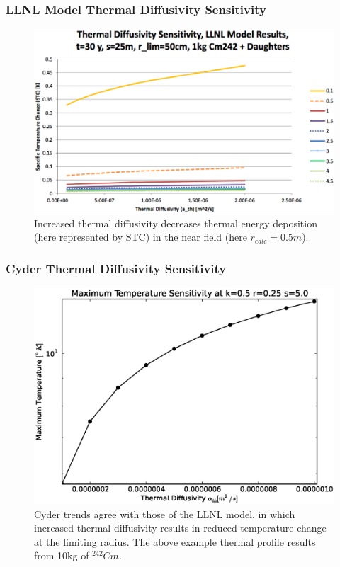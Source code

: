 
\begin{frame}[ctb!]
\frametitle{LLNL Model Thermal Diffusivity Sensitivity}
\begin{figure}[htbp!]
\begin{center}
\includegraphics[height=0.7\textheight]{./thermal_demonstration/diffusivity/diffusivity.eps}
\end{center}
\caption[$K_{th}$ Sensitivity to $\alpha_{th}$]{Increased thermal 
diffusivity decreases thermal energy deposition (here represented by STC) in 
the near field (here $r_{calc} = 0.5m$).}
\label{fig:Cm242alpha_kth_low}
\end{figure}
\end{frame}

\begin{frame}[ctb!]
\frametitle{Cyder Thermal Diffusivity Sensitivity}
\begin{figure}[htbp!]
\begin{center}
\includegraphics[height=0.7\textheight]{./thermal_demonstration/diffusivity/diffusivity_cyder.eps}
\caption[$\alpha_{th}$ Sensitivity in Cyder]{Cyder trends agree with those of 
the LLNL model, in which increased thermal diffusivity results in reduced 
temperature change at the limiting radius. The above example thermal profile 
results from 10kg of $^{242}Cm$.} 
\label{fig:ar}
\end{center}
\end{figure}
\end{frame}

